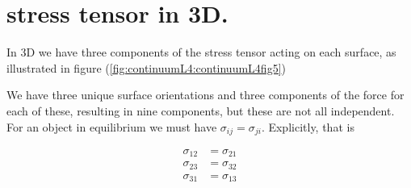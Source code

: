 \section{stress tensor in 3D.}

In 3D we have three components of the stress tensor acting on each surface, as illustrated in figure (\ref{fig:continuumL4:continuumL4fig5})

We have three unique surface orientations and three components of the force for each of these, resulting in nine components, but these are not all independent.  For an object in equilibrium we must have $\sigma_{ij} = \sigma_{ji}$.
Explicitly, that is

\begin{align}\label{eqn:continuumL4:110}
\sigma_{12} &= \sigma_{21} \\
\sigma_{23} &= \sigma_{32} \\
\sigma_{31} &= \sigma_{13}
\end{align}

